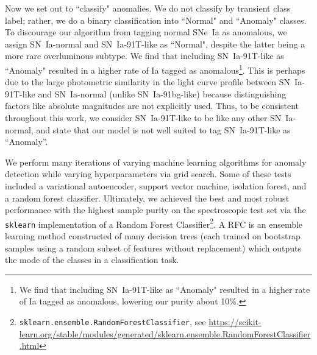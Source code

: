 \documentclass[twocolumn]{aastex63}
\begin{document}
Now we set out to ``classify" anomalies. We do not classify by transient class label; rather, we do a binary classification into ``Normal" and ``Anomaly" classes. To discourage our algorithm from tagging normal SNe~Ia as anomalous, we assign SN~Ia-normal and SN~Ia-91T-like as ``Normal", despite the latter being a more rare overluminous subtype. We find that including SN~Ia-91T-like as ``Anomaly" resulted in a higher rate of Ia tagged as anomalous\footnote{We find that including SN~Ia-91T-like as ``Anomaly" resulted in a higher rate of Ia tagged as anomalous, lowering our purity about 10\%.}. This is perhaps due to the large photometric similarity in the light curve profile between SN~Ia-91T-like and SN~Ia-normal (unlike SN~Ia-91bg-like) because distinguishing factors like absolute magnitudes are not explicitly used. Thus, to be consistent throughout this work, we consider SN~Ia-91T-like to be like any other SN~Ia-normal, and state that our model is not well suited to tag SN~Ia-91T-like as ``Anomaly''. \par

We perform many iterations of varying machine learning algorithms for anomaly detection while varying hyperparameters via grid search. Some of these tests included a variational autoencoder, support vector machine, isolation forest, and a random forest classifier. Ultimately, we achieved the best and most robust performance with the highest sample purity on the spectroscopic test set via the \texttt{sklearn} implementation of a Random Forest Classifier\footnote{\texttt{sklearn.ensemble.RandomForestClassifier}, see \url{https://scikit-learn.org/stable/modules/generated/sklearn.ensemble.RandomForestClassifier.html}}. A RFC is an ensemble learning method constructed of many decision trees (each trained on bootstrap samples using a random subset of features without replacement) which outputs the mode of the classes in a classification task. \par
\end{document}
